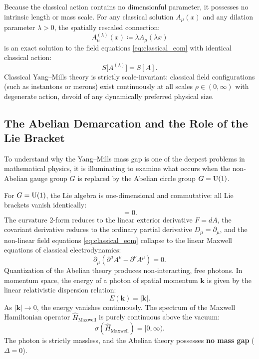 Because the classical action contains no dimensionful parameter, it possesses no intrinsic length or mass scale. For any classical solution $A_\mu(x)$ and any dilation parameter $\lambda > 0$, the spatially rescaled connection:
\begin{equation}
A_\mu^{(\lambda)}(x) \coloneqq \lambda A_\mu(\lambda x)
\end{equation}
is an exact solution to the field equations \eqref{eq:classical_eom} with identical classical action:
\begin{equation}
S\bigl[ A^{(\lambda)} \bigr] = S[A].
\end{equation}
Classical Yang--Mills theory is strictly scale-invariant: classical field configurations (such as instantons or merons) exist continuously at all scales $\rho \in (0, \infty)$ with degenerate action, devoid of any dynamically preferred physical size.

\subsection{The Abelian Demarcation and the Role of the Lie Bracket}
\label{subsec:abelian_demarcation}
To understand why the Yang--Mills mass gap is one of the deepest problems in mathematical physics, it is illuminating to examine what occurs when the non-Abelian gauge group $G$ is replaced by the Abelian circle group $G = \mathrm{U}(1)$.

For $G = \mathrm{U}(1)$, the Lie algebra is one-dimensional and commutative: all Lie brackets vanish identically:
\begin{equation}
[A_\mu, A_\nu] = 0.
\end{equation}
The curvature 2-form reduces to the linear exterior derivative $F = dA$, the covariant derivative reduces to the ordinary partial derivative $D_\mu = \partial_\mu$, and the non-linear field equations \eqref{eq:classical_eom} collapse to the linear Maxwell equations of classical electrodynamics:
\begin{equation}
\partial_\mu (\partial^\mu A^\nu - \partial^\nu A^\mu) = 0.
\end{equation}
Quantization of the Abelian theory produces non-interacting, free photons. In momentum space, the energy of a photon of spatial momentum $\mathbf{k}$ is given by the linear relativistic dispersion relation:
\begin{equation}
E(\mathbf{k}) = |\mathbf{k}|.
\end{equation}
As $|\mathbf{k}| \to 0$, the energy vanishes continuously. The spectrum of the Maxwell Hamiltonian operator $\hat{H}_{\mathrm{Maxwell}}$ is purely continuous above the vacuum:
\begin{equation}
\sigma(\hat{H}_{\mathrm{Maxwell}}) = [0, \infty).
\end{equation}
The photon is strictly massless, and the Abelian theory possesses \textbf{no mass gap} ($\Delta = 0$).

